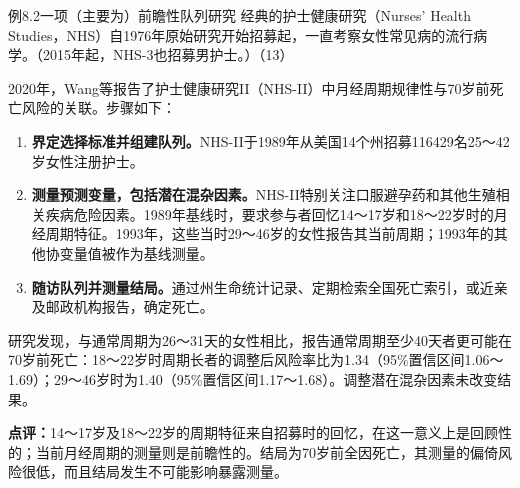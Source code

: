 \begin{bookbox}{例8.2\quad 一项（主要为）前瞻性队列研究}
经典的护士健康研究（Nurses’ Health Studies，NHS）自1976年原始研究开始招募起，一直考察女性常见病的流行病学。（2015年起，NHS-3也招募男护士。）（13）

2020年，Wang等报告了护士健康研究II（NHS-II）中月经周期规律性与70岁前死亡风险的关联。步骤如下：
\begin{enumerate}
\item \textbf{界定选择标准并组建队列。}NHS-II于1989年从美国14个州招募116429名25～42岁女性注册护士。
\item \textbf{测量预测变量，包括潜在混杂因素。}NHS-II特别关注口服避孕药和其他生殖相关疾病危险因素。1989年基线时，要求参与者回忆14～17岁和18～22岁时的月经周期特征。1993年，这些当时29～46岁的女性报告其当前周期；1993年的其他协变量值被作为基线测量。
\item \textbf{随访队列并测量结局。}通过州生命统计记录、定期检索全国死亡索引，或近亲及邮政机构报告，确定死亡。
\end{enumerate}
研究发现，与通常周期为26～31天的女性相比，报告通常周期至少40天者更可能在70岁前死亡：18～22岁时周期长者的调整后风险率比为1.34（95\%置信区间1.06～1.69）；29～46岁时为1.40（95\%置信区间1.17～1.68）。调整潜在混杂因素未改变结果。

\textbf{点评：}14～17岁及18～22岁的周期特征来自招募时的回忆，在这一意义上是回顾性的；当前月经周期的测量则是前瞻性的。结局为70岁前全因死亡，其测量的偏倚风险很低，而且结局发生不可能影响暴露测量。
\end{bookbox}

